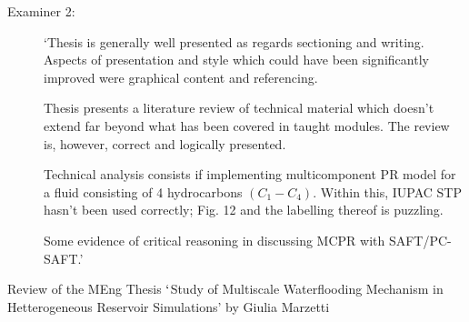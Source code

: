 \documentclass[14pt,twoside]{report}
\begin{document}
\begin{description}
\item[Examiner 2:] `Thesis is generally well presented as regards sectioning and writing. Aspects of presentation and style which could have been significantly improved were graphical content and referencing.

Thesis presents a literature review of technical material which doesn't extend far beyond what has been covered in taught modules. The review is, however, correct and logically presented. 

Technical analysis consists if implementing multicomponent PR model for a fluid consisting of 4 hydrocarbons $\left(C_{1}-C_{4}\right)$. Within this, IUPAC STP hasn't been used correctly; Fig. 12 and the labelling thereof is puzzling. 

Some evidence of critical reasoning in discussing MCPR with SAFT/PC-SAFT.'

\end{description}

\clearpage




\bigskip

\begin{center}
  {\Large Review of the MEng Thesis $\lq$Study of Multiscale Waterflooding Mechanism in Hetterogeneous Reservoir Simulations' by Giulia Marzetti}
\end{center}
\end{document}
